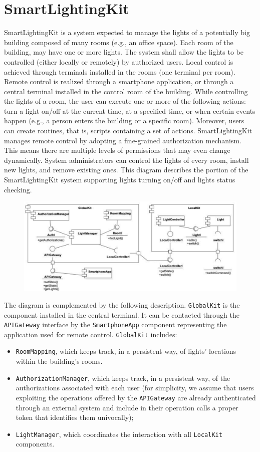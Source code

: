 \section{SmartLightingKit}

SmartLightingKit is a system expected to manage the lights of a potentially big building composed of many rooms (e.g., an office space).
Each room of the building, may have one or more lights.
The system shall allow the lights to be controlled (either locally or remotely) by authorized users. 
Local control is achieved through terminals installed in the rooms (one terminal per room). 
Remote control is realized through a smartphone application, or through a central terminal installed in the control room of the building.
While controlling the lights of a room, the user can execute one or more of the following actions: turn a light on/off at the current time, at a specified time, or when certain events happen (e.g., a person enters the building or a specific room). 
Moreover, users can create routines, that is, scripts containing a set of actions.
SmartLightingKit manages remote control by adopting a fine-grained authorization mechanism.
This means there are multiple levels of permissions that may even change dynamically.
System administrators can control the lights of every room, install new lights, and remove existing ones. 
This diagram describes the portion of the SmartLightingKit system supporting lights turning on/off and lights status checking.
\begin{figure}[H]
    \centering
    \includegraphics[width=0.9\linewidth]{images/uml1.png}
\end{figure}
The diagram is complemented by the following description.
\texttt{GlobalKit} is the component installed in the central terminal. 
It can be contacted through the \texttt{APIGateway} interface by the \texttt{SmartphoneApp} component representing the application used for remote control. 
\texttt{GlobalKit} includes:
\begin{itemize}
    \item \texttt{RoomMapping}, which keeps track, in a persistent way, of lights' locations within the building's rooms. 
    \item \texttt{AuthorizationManager}, which keeps track, in a persistent way, of the authorizations associated with each user (for simplicity, we assume that users exploiting the operations offered by the \texttt{APIGateway} are already authenticated through an external system and include in their operation calls a proper token that identifies them univocally);
    \item \texttt{LightManager}, which coordinates the interaction with all \texttt{LocalKit} components.
\end{itemize}

